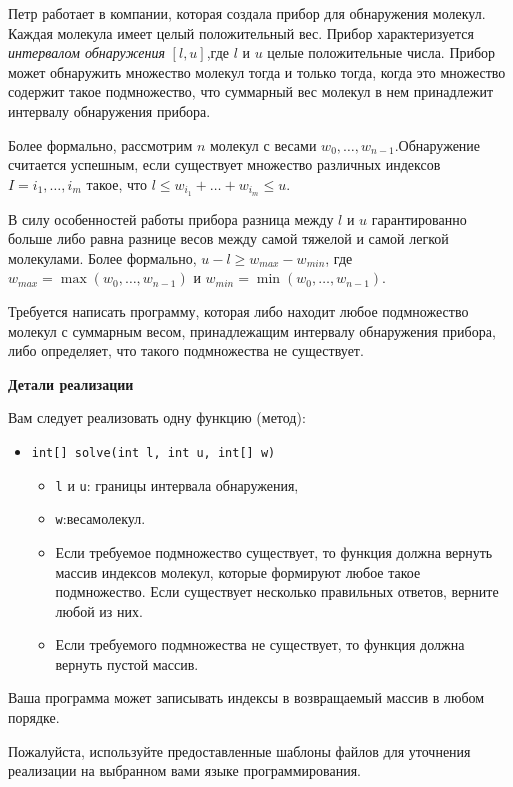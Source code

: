 Петр работает в компании, которая создала прибор для обнаружения молекул. Каждая молекула имеет целый положительный вес. Прибор характеризуется \textit{интервалом обнаружения} $[l, u]$,где $l$ и $u$ целые положительные числа. Прибор может обнаружить множество молекул тогда и только тогда, когда это множество содержит такое подмножество, что суммарный вес молекул в нем принадлежит интервалу обнаружения прибора.

Более формально, рассмотрим $n$ молекул с весами $w_0, \ldots, w_{n - 1}$.Обнаружение считается успешным, если существует множество различных индексов $I = {i_1, \ldots , i_m}$ такое, что $l \le w_{i_1} + \ldots + w_{i_m} \le u$.

В силу особенностей работы прибора разница между $l$ и $u$ гарантированно больше либо равна разнице весов между самой тяжелой и самой легкой молекулами. Более формально, $u - l \ge w_{max} - w_{min}$, где $w_{max}=\max(w_0, \ldots, w_{n - 1})$ и $w_{min}=\min(w_0, \ldots, w_{n - 1})$.

Требуется написать программу, которая либо находит любое подмножество молекул с суммарным весом, принадлежащим интервалу обнаружения прибора, либо определяет, что такого подмножества не существует.

\textbf{Детали реализации}

Вам следует реализовать одну функцию (метод):
\begin{itemize}
\item \texttt{int[] solve(int l, int u, int[] w)}

\begin{itemize}
\item \texttt{l} и \texttt{u}: границы интервала обнаружения,
\item \texttt{w}:весамолекул.
\item Если требуемое подмножество существует, то функция должна вернуть массив индексов молекул, которые формируют любое такое подмножество. Если существует несколько правильных ответов, верните любой из них.
\item Если требуемого подмножества не существует, то функция должна вернуть пустой массив.
\end{itemize}
\end{itemize}

Ваша программа может записывать индексы в возвращаемый массив в любом порядке.

Пожалуйста, используйте предоставленные шаблоны файлов для уточнения реализации на выбранном вами языке программирования.